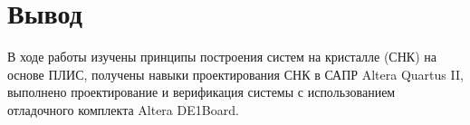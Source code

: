 \chapter*{Вывод}

В ходе работы изучены принципы построения систем на кристалле (СНК) на основе ПЛИС, получены навыки проектирования СНК в САПР Altera Quartus II, выполнено проектирование и верификация системы с использованием отладочного комплекта Altera DE1Board.
